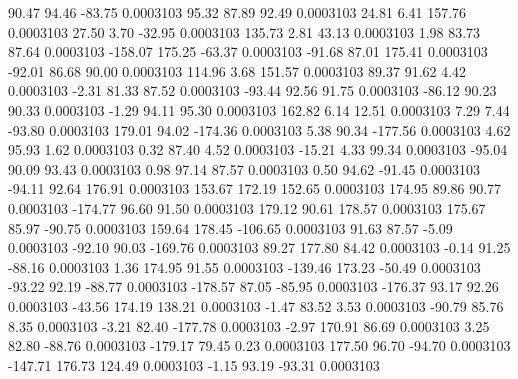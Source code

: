        90.47       94.46      -83.75     0.0003103
       95.32       87.89       92.49     0.0003103
       24.81        6.41      157.76     0.0003103
       27.50        3.70      -32.95     0.0003103
      135.73        2.81       43.13     0.0003103
        1.98       83.73       87.64     0.0003103
     -158.07      175.25      -63.37     0.0003103
      -91.68       87.01      175.41     0.0003103
      -92.01       86.68       90.00     0.0003103
      114.96        3.68      151.57     0.0003103
       89.37       91.62        4.42     0.0003103
       -2.31       81.33       87.52     0.0003103
      -93.44       92.56       91.75     0.0003103
      -86.12       90.23       90.33     0.0003103
       -1.29       94.11       95.30     0.0003103
      162.82        6.14       12.51     0.0003103
        7.29        7.44      -93.80     0.0003103
      179.01       94.02     -174.36     0.0003103
        5.38       90.34     -177.56     0.0003103
        4.62       95.93        1.62     0.0003103
        0.32       87.40        4.52     0.0003103
      -15.21        4.33       99.34     0.0003103
      -95.04       90.09       93.43     0.0003103
        0.98       97.14       87.57     0.0003103
        0.50       94.62      -91.45     0.0003103
      -94.11       92.64      176.91     0.0003103
      153.67      172.19      152.65     0.0003103
      174.95       89.86       90.77     0.0003103
     -174.77       96.60       91.50     0.0003103
      179.12       90.61      178.57     0.0003103
      175.67       85.97      -90.75     0.0003103
      159.64      178.45     -106.65     0.0003103
       91.63       87.57       -5.09     0.0003103
      -92.10       90.03     -169.76     0.0003103
       89.27      177.80       84.42     0.0003103
       -0.14       91.25      -88.16     0.0003103
        1.36      174.95       91.55     0.0003103
     -139.46      173.23      -50.49     0.0003103
      -93.22       92.19      -88.77     0.0003103
     -178.57       87.05      -85.95     0.0003103
     -176.37       93.17       92.26     0.0003103
      -43.56      174.19      138.21     0.0003103
       -1.47       83.52        3.53     0.0003103
      -90.79       85.76        8.35     0.0003103
       -3.21       82.40     -177.78     0.0003103
       -2.97      170.91       86.69     0.0003103
        3.25       82.80      -88.76     0.0003103
     -179.17       79.45        0.23     0.0003103
      177.50       96.70      -94.70     0.0003103
     -147.71      176.73      124.49     0.0003103
       -1.15       93.19      -93.31     0.0003103
